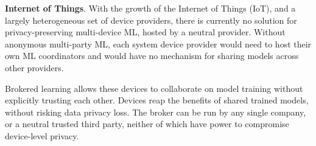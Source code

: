 \noindent \textbf{Internet of Things}. With the growth of the Internet
of Things (IoT), and a largely heterogeneous set of device providers,
there is currently no solution for privacy-preserving multi-device ML,
hosted by a neutral provider. Without anonymous multi-party ML, each
system device provider would need to host their own ML coordinators and
would have no mechanism for sharing models across other providers. 

Brokered learning allows these devices to collaborate on model training
without explicitly trusting each other. Devices reap the benefits of
shared trained models, without risking data privacy loss. The broker
can be run by any single company, or a neutral trusted third party,
neither of which have power to compromise device-level privacy.

